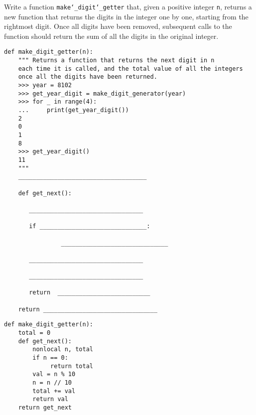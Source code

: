 \begin{blocksection}
\question Write a function \texttt{make\char`_digit\char`_getter} that, given a positive integer \texttt{n}, returns a new function that returns the digits in the integer  
one by one, starting from the rightmost digit. Once all digits have been removed, subsequent calls to the function should return the sum of all the digits in the original integer.

\begin{lstlisting}
def make_digit_getter(n):
    """ Returns a function that returns the next digit in n
    each time it is called, and the total value of all the integers
    once all the digits have been returned.
    >>> year = 8102
    >>> get_year_digit = make_digit_generator(year)
    >>> for _ in range(4):
    ...     print(get_year_digit())
    2
    0
    1
    8
    >>> get_year_digit()
    11
    """
    ____________________________________

    def get_next():
        
       ________________________________
        
       if ______________________________:

                ______________________________
        
       ________________________________
        
       ________________________________
       
       return  __________________________

    return ________________________________
\end{lstlisting}

\begin{solution}
\begin{lstlisting}
def make_digit_getter(n):
    total = 0
    def get_next():
        nonlocal n, total
        if n == 0:
             return total
        val = n % 10
        n = n // 10
        total += val
        return val
    return get_next
\end{lstlisting}
\end{solution}

\end{blocksection}
